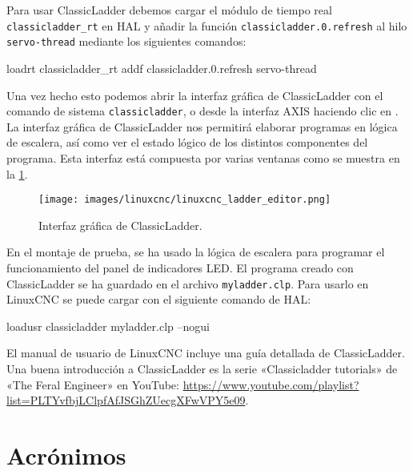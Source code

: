 \documentclass[english,spanish,a4paper,11pt]{article}
\begin{document}
Para usar ClassicLadder debemos cargar el módulo de tiempo real \texttt{classicladder\_rt} en \ac{HAL} y añadir la función \texttt{classicladder.0.refresh} al hilo \texttt{servo-thread} mediante los siguientes comandos:
%
\begin{listingbox}
loadrt classicladder_rt
addf classicladder.0.refresh servo-thread
\end{listingbox}

Una vez hecho esto podemos abrir la interfaz gráfica de ClassicLadder con el comando de sistema \texttt{classicladder}, o desde la interfaz AXIS haciendo clic en . La interfaz gráfica de ClassicLadder nos permitirá elaborar programas en lógica de escalera, así como ver el estado lógico de los distintos componentes del programa. Esta interfaz está compuesta por varias ventanas como se muestra en la \cref{fig:classicladder}.

\begin{figure}[!ht]
    \centering
    \texttt{[image: images/linuxcnc/linuxcnc\_ladder\_editor.png]}
    \caption{Interfaz gráfica de ClassicLadder.}
    \label{fig:classicladder}
\end{figure}

En el montaje de prueba, se ha usado la lógica de escalera para programar el funcionamiento del panel de indicadores LED. El programa creado con ClassicLadder se ha guardado en el archivo \texttt{myladder.clp}. Para usarlo en LinuxCNC se puede cargar con el siguiente comando de \ac{HAL}:
%
\begin{listingbox}
loadusr classicladder myladder.clp --nogui
\end{listingbox}

El manual de usuario de LinuxCNC \cite{linuxcncdoc} incluye una guía detallada de ClassicLadder. Una buena introducción a ClassicLadder es la serie «Classicladder tutorials» de «The Feral Engineer» en YouTube: \url{https://www.youtube.com/playlist?list=PLTYvfbjLClpfAfJSGhZUecgXFwVPY5e09}.



\printbibliography[heading=bibintoc]

\section*{Acrónimos}
\printacronyms[heading = none]
\end{document}
